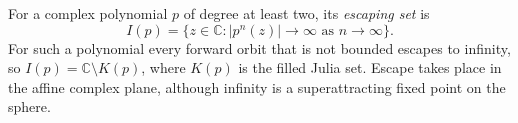 
For a complex polynomial $p$ of degree at least two, its \emph{escaping set} is
\[
I(p)=\{z\in\mathbb C:|p^n(z)|\to\infty\text{ as }n\to\infty\}.
\]
For such a polynomial every forward orbit that is not bounded escapes to infinity, so $I(p)=\mathbb C\setminus K(p)$, where $K(p)$ is the filled Julia set. Escape takes place in the affine complex plane, although infinity is a superattracting fixed point on the sphere.
